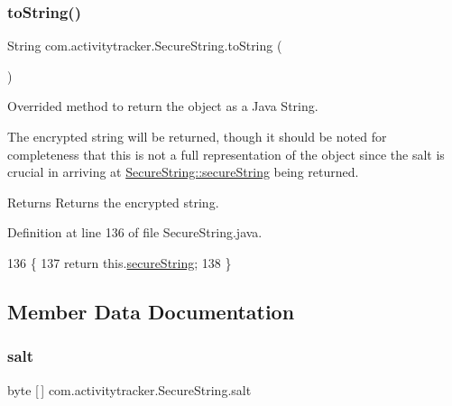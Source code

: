 \subsubsection{\texorpdfstring{to\+String()}{toString()}}
{\footnotesize\ttfamily String com.\+activitytracker.\+Secure\+String.\+to\+String (\begin{DoxyParamCaption}{ }\end{DoxyParamCaption})}

Overrided method to return the object as a Java String.

The encrypted string will be returned, though it should be noted for completeness that this is not a full representation of the object since the salt is crucial in arriving at \mbox{\hyperlink{classcom_1_1activitytracker_1_1_secure_string_a1448f7b8865c6c57cc7218662ee7f1ee}{Secure\+String\+::secure\+String}} being returned.

\begin{DoxyReturn}{Returns}
Returns the encrypted string. 
\end{DoxyReturn}


Definition at line 136 of file Secure\+String.\+java.


\begin{DoxyCode}
136                              \{
137         \textcolor{keywordflow}{return} this.\mbox{\hyperlink{classcom_1_1activitytracker_1_1_secure_string_a1448f7b8865c6c57cc7218662ee7f1ee}{secureString}};
138     \}
\end{DoxyCode}


\subsection{Member Data Documentation}
\mbox{\label{classcom_1_1activitytracker_1_1_secure_string_a8549ead1f186ff0c2520818b03d1cc21}} 
\subsubsection{\texorpdfstring{salt}{salt}}
{\footnotesize\ttfamily byte \mbox{[}$\,$\mbox{]} com.\+activitytracker.\+Secure\+String.\+salt\hspace{0.3cm}{\ttfamily [private]}}

